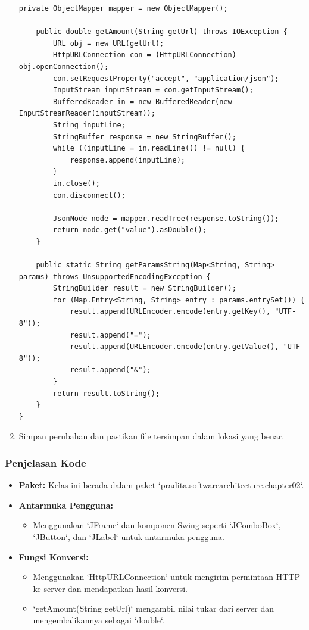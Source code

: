\begin{enumerate}
\begin{lstlisting}[style=JavaStyle]
	private ObjectMapper mapper = new ObjectMapper();
	
	public double getAmount(String getUrl) throws IOException {
		URL obj = new URL(getUrl);
		HttpURLConnection con = (HttpURLConnection) obj.openConnection();
		con.setRequestProperty("accept", "application/json");
		InputStream inputStream = con.getInputStream();
		BufferedReader in = new BufferedReader(new InputStreamReader(inputStream));
		String inputLine;
		StringBuffer response = new StringBuffer();
		while ((inputLine = in.readLine()) != null) {
			response.append(inputLine);
		}
		in.close();
		con.disconnect();
		
		JsonNode node = mapper.readTree(response.toString());
		return node.get("value").asDouble();
	}
	
	public static String getParamsString(Map<String, String> params) throws UnsupportedEncodingException {
		StringBuilder result = new StringBuilder();
		for (Map.Entry<String, String> entry : params.entrySet()) {
			result.append(URLEncoder.encode(entry.getKey(), "UTF-8"));
			result.append("=");
			result.append(URLEncoder.encode(entry.getValue(), "UTF-8"));
			result.append("&");
		}
		return result.toString();
	}
}
\end{lstlisting}

\item Simpan perubahan dan pastikan file tersimpan dalam lokasi yang benar.
\end{enumerate}

\subsubsection{Penjelasan Kode}
\begin{itemize}
\item \textbf{Paket:} Kelas ini berada dalam paket `pradita.softwarearchitecture.chapter02`.
\item \textbf{Antarmuka Pengguna:}
\begin{itemize}
\item Menggunakan `JFrame` dan komponen Swing seperti `JComboBox`, `JButton`, dan `JLabel` untuk antarmuka pengguna.
\end{itemize}
\item \textbf{Fungsi Konversi:}
\begin{itemize}
\item Menggunakan `HttpURLConnection` untuk mengirim permintaan HTTP ke server dan mendapatkan hasil konversi.
\item `getAmount(String getUrl)` mengambil nilai tukar dari server dan mengembalikannya sebagai `double`.
\end{itemize}
\end{itemize}

